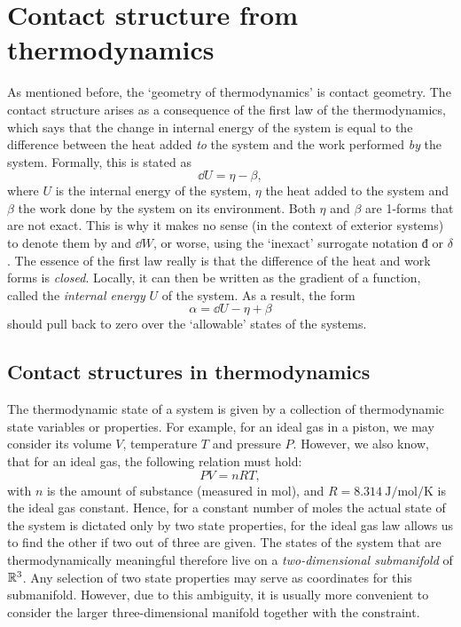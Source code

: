 \section{Contact structure from thermodynamics}
\label{sec:thermodynamics}
As mentioned before, the `geometry of thermodynamics' is contact geometry. The contact structure arises as a consequence of the first law of the thermodynamics, which says that the change in internal energy of the system is equal to the difference between the heat added \emph{to} the system and the work performed \emph{by} the system. Formally, this is stated as
\begin{equation}
    \dd{U} = \eta - \beta,
    \label{eq:thermo_first_law}
\end{equation}
where $U$ is the internal energy of the system, $\eta$ the heat added to the system and $\beta$ the work done by the system on its environment. Both $\eta$ and $\beta$ are 1-forms that are not exact. This is why it makes no sense (in the context of exterior systems) to denote them by \dj and $\dd{W}$, or worse, using the `inexact' surrogate notation $\text{đ}$ or $\delta$. The essence of the first law really is that the difference of the heat and work forms is \emph{closed}. Locally, it can then be written as the gradient of a function, called the \emph{internal energy} $U$ of the system. As a result, the form 
$$ \alpha = \dd{U} - \eta + \beta $$
should pull back to zero over the `allowable' states of the systems.

\subsection{Contact structures in thermodynamics} 
The thermodynamic state of a system is given by a collection of thermodynamic state variables or properties. For example, for an ideal gas in a piston, we may consider its volume $V$, temperature $T$ and pressure $P$. However, we also know, that for an ideal gas, the following relation must hold:
\begin{equation}
    PV = nRT,
    \label{eq:ideal_gas}
\end{equation}
with $n$ is the amount of substance (measured in \si{\mole}), and $R = \SI{8.314}{\joule \per \mole \per \kelvin}$ is the ideal gas constant.  Hence, for a constant number of moles the actual state of the system is dictated only by two state properties, for the ideal gas law allows us to find the other if two out of three are given. The states of the system that are thermodynamically meaningful therefore live on a \emph{two-dimensional submanifold} of $\mathbb{R}^3$. Any selection of two state properties may serve as coordinates for this submanifold. However, due to this ambiguity, it is usually more convenient to consider the larger three-dimensional manifold together with the constraint.  \cite{Balian2001, Giancoli2014}

